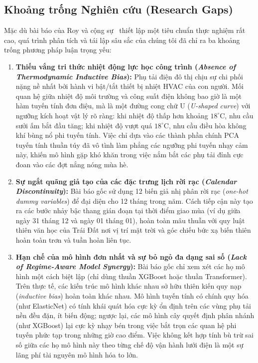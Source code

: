 \subsection{Khoảng trống Nghiên cứu (Research Gaps)}
Mặc dù bài báo của Roy và cộng sự~\cite{roy2025hourly} thiết lập một tiêu chuẩn thực nghiệm rất cao, quá trình phân tích và tái lập sâu sắc của chúng tôi đã chỉ ra ba khoảng trống phương pháp luận trọng yếu:

\begin{enumerate}
    \item \textbf{Thiếu vắng tri thức nhiệt động lực học công trình (\textit{Absence of Thermodynamic Inductive Bias}):} Phụ tải điện đô thị chịu sự chi phối nặng nề nhất bởi hành vi bật/tắt thiết bị nhiệt HVAC của con người. Mối quan hệ giữa nhiệt độ môi trường và công suất điện không bao giờ là một hàm tuyến tính đơn điệu, mà là một đường cong chữ U (\textit{U-shaped curve}) với ngưỡng kích hoạt vật lý rõ ràng: khi nhiệt độ thấp hơn khoảng $18^\circ\text{C}$, nhu cầu sưởi ấm bắt đầu tăng; khi nhiệt độ vượt quá $18^\circ\text{C}$, nhu cầu điều hòa không khí bùng nổ phi tuyến tính. Việc chỉ dựa vào các thành phần chính PCA tuyến tính thuần túy đã vô tình làm phẳng các ngưỡng phi tuyến nhạy cảm này, khiến mô hình gặp khó khăn trong việc nắm bắt các phụ tải đỉnh cực đoan vào các đợt nắng nóng mùa hè.
    \item \textbf{Sự ngắt quãng giả tạo của các đặc trưng lịch rời rạc (\textit{Calendar Discontinuity}):} Bài báo gốc sử dụng 12 biến giả nhị phân rời rạc (\textit{one-hot dummy variables}) để đại diện cho 12 tháng trong năm. Cách tiếp cận này tạo ra các bước nhảy bậc thang gián đoạn tại thời điểm giao mùa (ví dụ giữa ngày 31 tháng 12 và ngày 01 tháng 01), hoàn toàn mâu thuẫn với quy luật thiên văn học của Trái Đất nơi vị trí mặt trời và góc chiếu bức xạ biến thiên hoàn toàn trơn và tuần hoàn liên tục.
    \item \textbf{Hạn chế của mô hình đơn nhất và sự bỏ ngỏ đa dạng sai số (\textit{Lack of Regime-Aware Model Synergy}):} Bài báo gốc chỉ xem xét các họ mô hình một cách biệt lập (chỉ dùng thuần XGBoost hoặc thuần Transformer). Trên thực tế, các kiến trúc mô hình khác nhau sở hữu thiên kiến quy nạp (\textit{inductive bias}) hoàn toàn khác nhau. Mô hình tuyến tính có chính quy hóa (như ElasticNet) có tính khái quát hóa cực kỳ ổn định trên các vùng phụ tải nền đều đặn, ít biến động; ngược lại, các mô hình cây quyết định phân nhánh (như XGBoost) lại cực kỳ nhạy bén trong việc bắt trọn các quan hệ phi tuyến phức tạp trong những giờ cao điểm. Việc không kết hợp tính bù trừ sai số giữa các họ mô hình này theo từng chế độ vận hành lưới điện là một sự lãng phí tài nguyên mô hình hóa to lớn.
\end{enumerate}

